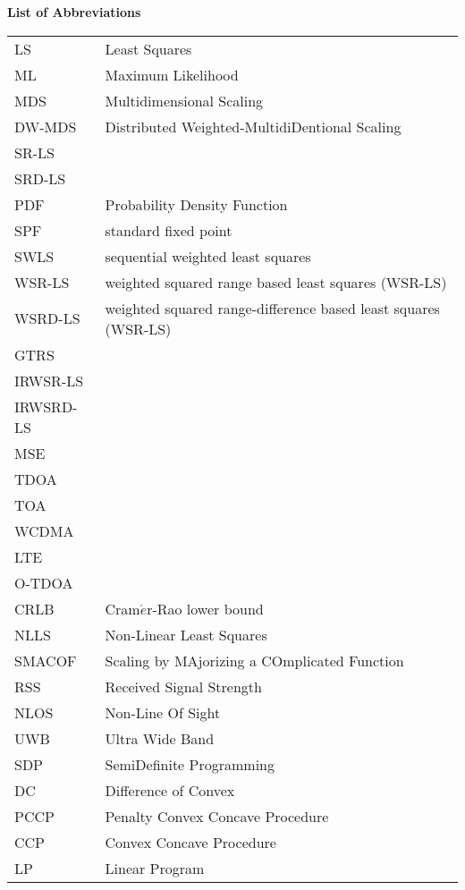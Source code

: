 \newpage
{}

\phantom{m}



\begin{flushleft}
\begin{Huge}
\textbf{List of Abbreviations}
\end{Huge}
\end{flushleft}

\begin{table}[h]
\begin{tabular}{l l} 
LS & Least Squares \\
ML & Maximum Likelihood \\
MDS & Multidimensional Scaling \\ 
DW-MDS & Distributed Weighted-MultidiDentional Scaling \\
SR-LS  & \\
SRD-LS & \\
PDF & Probability Density Function \\
SPF & standard fixed point\\
SWLS & sequential weighted least squares \\
WSR-LS & weighted squared range based least squares (WSR-LS)\\
WSRD-LS & weighted squared range-difference based least squares (WSR-LS)\\
GTRS & \\
IRWSR-LS & \\
IRWSRD-LS & \\
MSE & \\
TDOA & \\
TOA & \\
WCDMA & \\
LTE & \\
O-TDOA & \\
CRLB & Cram$\acute{e}$r-Rao  lower  bound \\
NLLS & Non-Linear Least Squares \\
SMACOF & Scaling by MAjorizing a COmplicated Function \\
RSS & Received Signal Strength \\
NLOS & Non-Line Of Sight \\
UWB & Ultra Wide Band \\
SDP & SemiDefinite Programming \\
DC & Difference of Convex \\
PCCP & Penalty Convex Concave Procedure \\
CCP & Convex Concave Procedure \\
LP & Linear Program \\
\end{tabular}
\end{table}
